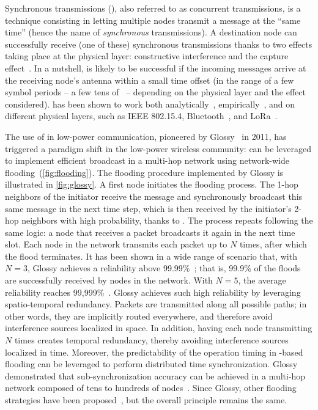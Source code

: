 Synchronous transmissions (\ST), also referred to as concurrent transmissions, is a technique consisting in letting  multiple nodes transmit a message at the ``same time'' (hence the name of \emph{synchronous} transmissions).
A destination node can successfully receive (one of these) synchronous transmissions thanks to two effects taking place at the physical layer: constructive interference and the capture effect~\cite{yuan2013LetTalkTogether, escobar-molero2019Improving}.
In a nutshell, \ST is likely to be successful if the incoming messages arrive at the receiving node's antenna within a small time offset (in the range of a few symbol periods -- a few tens of \us~-- depending on the physical layer and the effect considered).
\ST has been shown to work both analytically~\cite{wilhelm2014Reception}, empirically~\cite{ferrari2011Glossy}, and on different physical layers, such as IEEE 802.15.4\cite{yuan2014Sparkle}, Bluetooth~\cite{alnahas2019BlueFlood}, and LoRa~\cite{wegmann2018Reliable}.

The use of \ST in low-power communication, pioneered by Glossy~\cite{ferrari2011Glossy} in 2011, has triggered a paradigm shift in the low-power wireless community: \ST can be leveraged to implement efficient broadcast in a multi-hop network using network-wide flooding~(\cref{fig:flooding}).
The flooding procedure implemented by Glossy is illustrated in \cref{fig:glossy}. A first node initiates the flooding process. The 1-hop neighbors of the initiator receive the message and synchronously broadcast this same message in the next time step, which is then received by the initiator's 2-hop neighbors with high probability, thanks to \ST. The process repeats following the same logic: a node that receives a packet broadcasts it again in the next time slot. Each node in the network transmits each packet up to $N$ times, after which the flood terminates.
It has been shown in a wide range of scenario that, with $N=3$, Glossy achieves a reliability above 99.99\%~\cite{ferrari2011Glossy}; that is, 99.9\% of the floods are successfully received by nodes in the network. With $N=5$, the average reliability reaches 99,999\%~\cite{ferrari2011Glossy}.
Glossy achieves such high reliability by leveraging spatio-temporal redundancy.
Packets are transmitted along all possible paths; in other words, they are implicitly routed everywhere, and therefore avoid interference sources localized in space.
In addition, having each node transmitting $N$ times creates temporal redundancy, thereby avoiding interference sources localized in time.
Moreover, the predictability of the operation timing in \ST-based flooding can be leveraged to perform distributed time synchronization. Glossy demonstrated that sub-\us synchronization accuracy can be achieved in a multi-hop network composed of tens to hundreds of nodes~\cite{ferrari2011Glossy}.
Since Glossy, other flooding strategies have been proposed~\cite{lim2017Competition, baddeley2019AtomicSDN, ma2019DeCoT}, but the overall principle remains the same.

